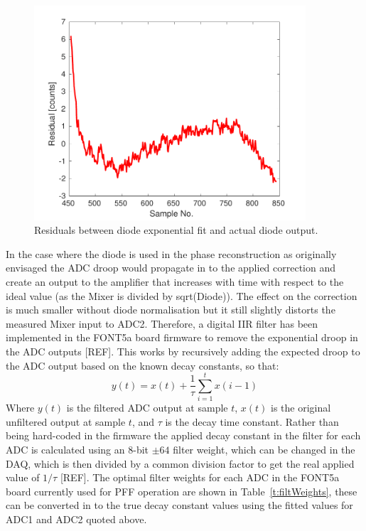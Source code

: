 \begin{figure}
  \centering
  \includegraphics[width=0.9\textwidth]{Figures/commissioning/iirDiodeFitResid}
  \caption{Residuals between diode exponential fit and actual diode output.}
  \label{f:iirDiodeFitResid}
\end{figure}

In the case where the diode is used in the phase reconstruction as originally envisaged the ADC droop would propagate in to the applied correction and create an output to the amplifier that increases with time with respect to the ideal value (as the Mixer is divided by sqrt(Diode)). The effect on the correction is much smaller without diode normalisation but it still slightly distorts the measured Mixer input to ADC2. Therefore, a digital IIR filter has been implemented in the FONT5a board firmware to remove the exponential droop in the ADC outputs [REF]. This works by recursively adding the expected droop to the ADC output based on the known decay constants, so that:
\begin{equation}
y(t) = x(t) + \frac{1}{\tau} \sum_{i=1}^{t} x(i-1)
\end{equation}
\label{e:iirFilt}
Where \(y(t)\) is the filtered ADC output at sample \(t\), \(x(t)\) is the original unfiltered output at sample \(t\), and \(\tau\) is the decay time constant. Rather than being hard-coded in the firmware the applied decay constant in the filter for each ADC is calculated using an 8-bit \(\pm64\) filter weight, which can be changed in the DAQ, which is then divided by a common division factor to get the real applied value of \(1/\tau\) [REF]. The optimal filter weights for each ADC in the FONT5a board currently used for PFF operation are shown in Table~\ref{t:filtWeights}, these can be converted in to the true decay constant values using the fitted values for ADC1 and ADC2 quoted above.

